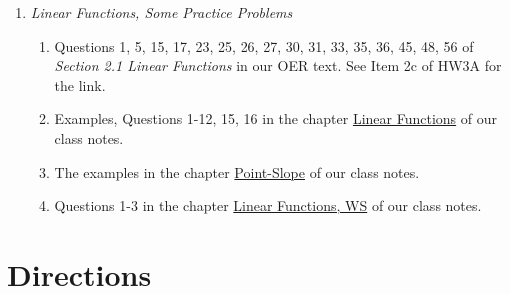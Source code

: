 \documentclass{ximera}
\begin{document}
\begin{enumerate}
\begin{enumerate}
\item Using point-slope to find an equation of a line given two points or a point and a slope.

\item Using point-slope to find an expression for a function in an applied scenario.

\item Using linear functions to answer related questions about inputs, outputs, and changes.
\end{enumerate}

\item \emph{Linear Functions, Some Practice Problems}

\begin{enumerate}
\item Questions 1, 5, 15, 17, 23, 25, 26, 27, 30, 31, 33, 35, 36, 45, 48, 56 of \emph{Section 2.1 Linear Functions} in our OER text. See Item 2c of HW3A for the link.

\item Examples, Questions 1-12, 15, 16 in the chapter \href{https://ximera.osu.edu/precalc1/PreCalculus1/LinearFunctions/LinearFunctions}{Linear Functions} of our class notes.

\item The examples in the chapter \href{https://ximera.osu.edu/precalc1/PreCalculus1/PointSlope/PointSlope}{Point-Slope} of our class notes.

\item Questions 1-3 in the chapter \href{https://ximera.osu.edu/precalc1/PreCalculus1/LinearFunctionsWS/LinearFunctionsWS}{Linear Functions, WS} of our class notes.

\end{enumerate}
\end{enumerate}

\section{Directions}
\end{document}
